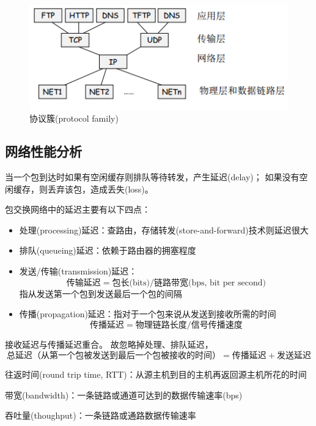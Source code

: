\myhline
\begin{figure}[H]
	\centering
	\includegraphics[width=0.5\linewidth]{fig/protocol_family.png}
	\caption*{协议簇(protocol family)}
\end{figure}

\subsection{网络性能分析}
当一个包到达时如果有空闲缓存则排队等待转发，产生延迟(delay)；
如果没有空闲缓存，则丢弃该包，造成丢失(loss)。

包交换网络中的延迟主要有以下四点：
\begin{itemize}
	\item 处理(processing)延迟：查路由，存储转发(store-and-forward)技术则延迟很大
	\item 排队(queueing)延迟：依赖于路由器的拥塞程度
	\item 发送/传输(transmission)延迟：\[\text{传输延迟}=\text{包长(bits)}/\text{链路带宽(bps, bit per second)}\]
	指从发送第一个包到发送最后一个包的间隔
	\item 传播(propagation)延迟：指对于一个包来说从发送到接收所需的时间
	\[\text{传播延迟}=\text{物理链路长度}/\text{信号传播速度}\]
\end{itemize}

接收延迟与传播延迟重合。
故忽略掉处理、排队延迟，
\[\text{总延迟（从第一个包被发送到最后一个包被接收的时间）}=\text{传播延迟}+\text{发送延迟}\]

\myhline
\par 往返时间(round trip time, RTT)：从源主机到目的主机再返回源主机所花的时间
\par 带宽(bandwidth)：一条链路或通道可达到的数据传输速率(bps)
\par 吞吐量(thoughput)：一条链路或通路数据传输速率


